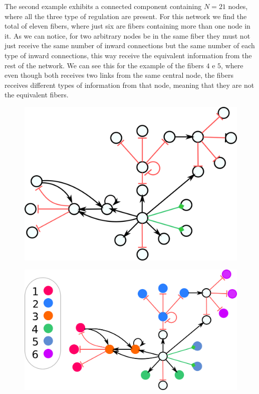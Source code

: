 \documentclass[12pt]{diazessay} %
\begin{document}
The second example exhibits a connected component containing $N = 21$ nodes, where all the three type of regulation are present. For this network we find the total of eleven fibers, where just six are fibers containing more than one node in it. As we can notice, for two arbitrary nodes be in the same fiber they must not just receive the same number of inward connections but the same number of each type of inward connections, this way receive the equivalent information from the rest of the network. We can see this for the example of the fibers $4$ e $5$, where even though both receives two links from the same central node, the fibers receives different types of information from that node, meaning that they are not the equivalent fibers.

\begin{figure}[H]
	\centering
	\includegraphics[scale=0.3]{Figures/result2.png}
\end{figure}
\begin{figure}[H]
	\centering
	\includegraphics[scale=0.3]{Figures/result2-label.png}
\end{figure}
\end{document}
